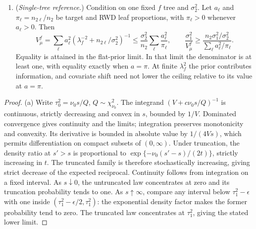 \documentclass[11pt]{article}
\newcommand{\E}{\mathbb{E}}
\theoremstyle{definition}
\theoremstyle{plain}
\providecommand{\DIFaddtex}[1]{{\protect\color{blue}\uwave{#1}}} %
\providecommand{\DIFaddbegin}{} %
\providecommand{\DIFaddend}{} %
\providecommand{\DIFadd}[1]{\texorpdfstring{\DIFaddtex{#1}}{#1}} %
\newcommand{\DIFaddincludegraphics}[2][]{{\color{blue}\fbox{\DIFOincludegraphics[#1]{#2}}}} %
\DeclareRobustCommand{\DIFaddbegin}{\DIFOaddbegin \let\includegraphics\DIFaddincludegraphics} %
\DeclareRobustCommand{\DIFaddend}{\DIFOaddend \let\includegraphics\DIFOincludegraphics} %
\begin{document}
{\begin{thmA}
\begin{enumerate}[label=(\alph*),leftmargin=2.2em]
For fixed $B$ and $m\to\infty$, every $V^{(b)}\to V_*$ almost surely. On a finite grid avoiding equality $\ess_0(V_*;s)=N_{\rm target}$ and containing an admissible point, selection by \eqref{eqA:prrule} eventually equals the smallest admissible grid value.
For fixed $m$ and $B\to\infty$, suppose $U_b>0$ almost surely and $u_m=\E U_b>0$. Put $\gamma=V_*/u_m$ and
\[
G_m(s)=P\{\ess_0(\gamma U_b;s)\le N_{\rm target}\}.
\]
At any $s$ for which $P\{\ess_0(\gamma U_b;s)=N_{\rm target}\}=0$, $\widehat G(s)\to G_m(s)$ almost surely. On a finite grid satisfying this condition, with $G_m(s)\ne q$ at every point and at least one $G_m(s)>q$, the empirical and population grid selections eventually agree.
\item (\emph{Single-tree reference.}) Condition on one fixed $f$ tree and $\sigma_2^2$. Let $a_\ell$ and $\pi_\ell=n_{2\ell}/n_2$ be target and RWD leaf proportions, with $\pi_\ell>0$ whenever $a_\ell>0$. \DIFaddbegin \DIFadd{Terms with $a_\ell=\pi_\ell=0$ contribute zero to the sums below. }\DIFaddend Then
\[
V_\mu^f=\sum_\ell a_\ell^2(\lambda_f^{-2}+n_{2\ell}/\sigma_2^2)^{-1}
\le\frac{\sigma_2^2}{n_2}\sum_\ell\frac{a_\ell^2}{\pi_\ell},\qquad
\frac{\sigma_1^2}{V_\mu^f}\ge\frac{n_2\sigma_1^2/\sigma_2^2}{\sum_\ell a_\ell^2/\pi_\ell}.
\]
Equality is attained in the flat-prior limit. In that limit the denominator is at least one, with equality exactly when $a=\pi$. At finite $\lambda_f^2$ the prior contributes information, and covariate shift need not lower the ceiling relative to its value at $a=\pi$.
\end{enumerate}
\end{thmA}

\begin{proof}
(a) Write $\tau_0^2=\nu_0s/Q$, $Q\sim\chi^2_{\nu_0}$. The integrand $(V+c\nu_0s/Q)^{-1}$ is continuous, strictly decreasing and convex in $s$, bounded by $1/V$. Dominated convergence gives continuity and the limits; integration preserves monotonicity and convexity. Its derivative is bounded in absolute value by $1/(4Vs)$, which permits differentiation on compact subsets of $(0,\infty)$. Under truncation, the density ratio at $s'>s$ is proportional to $\exp\{-\nu_0(s'-s)/(2t)\}$, strictly increasing in $t$. The truncated family is therefore stochastically increasing, giving strict decrease of the expected reciprocal. Continuity follows from integration on a fixed interval. As $s\downarrow0$, the untruncated law concentrates at zero and its truncation probability tends to one. As $s\uparrow\infty$, compare any interval below $\tau_1^2-\epsilon$ with one inside $(\tau_1^2-\epsilon/2,\tau_1^2)$: the exponential density factor makes the former probability tend to zero. The truncated law concentrates at $\tau_1^2$, giving the stated lower limit.


\end{proof}}
\end{document}
